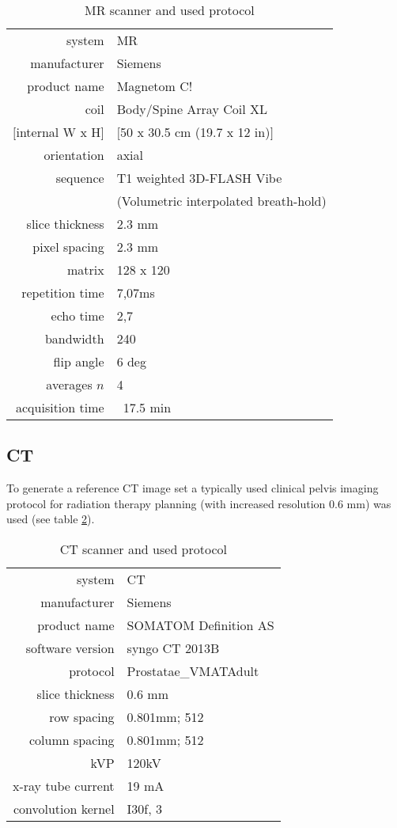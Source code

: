 \begin{table}[!tbh]
\centering
\begin{tabular}{r|l}
system			& MR				\\
manufacturer	& Siemens			\\
product name	& Magnetom C!		\\
coil			& Body/Spine Array Coil XL	\\
$[$internal W x H$]$& $[$50 x 30.5 cm (19.7 x 12 in)$]$	\\
orientation		& axial	\\
sequence		& T1 weighted 3D-FLASH Vibe	\\
				& (Volumetric interpolated breath-hold)	\\
slice thickness	& 2.3 mm	\\
pixel spacing	& 2.3 mm	\\
matrix			& 128 x 120 \\
repetition time & 7,07ms	\\
echo time		& 2,7	\\
bandwidth		& 240	\\
flip angle		& 6 deg	\\
averages $n$	& 4	\\
acquisition time& ~17.5 min
\end{tabular}
\caption{MR scanner and used protocol}
\label{tab:MR-scanner}
\end{table}


\clearpage

\subsection{CT}
To generate a reference CT image set a typically used clinical pelvis imaging protocol for radiation therapy planning (with increased resolution 0.6 mm) was used (see table \ref{tab:CT-scanner}).


\begin{table}[!tbh]
\centering
\begin{tabular}{r|l}
system			& CT				\\
manufacturer	& Siemens			\\
product name	& SOMATOM Definition AS		\\
software version& syngo CT 2013B	\\
protocol		& Prostatae\_VMATAdult	\\
slice thickness	& 0.6 mm	\\
row spacing		& 0.801mm; 512	\\
column spacing	& 0.801mm; 512	\\
kVP				& 120kV	\\
x-ray tube current	&	19 mA	\\
convolution kernel	&	I30f, 3
\end{tabular}
\caption{CT scanner and used protocol}
\label{tab:CT-scanner}
\end{table}


